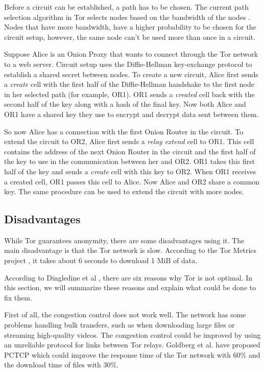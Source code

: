 \documentclass{article}
\begin{document}
		Before a circuit can be established, a path has to be chosen. The current path selection algorithm in Tor selects nodes based on the bandwidth of the nodes \cite{wang2012congestion}. Nodes that have more bandwidth, have a higher probability to be chosen for the circuit setup, however, the same node can't be used more than once in a circuit.
		
		Suppose Alice is an Onion Proxy that wants to connect through the Tor network to a web server. Circuit setup uses the Diffie-Hellman key-exchange protocol \cite{diffiehellman} to establish a shared secret between nodes. To create a new circuit, Alice first sends a \emph{create} cell with the first half of the Diffie-Hellman handshake to the first node in her selected path (for example, OR1). OR1 sends a \emph{created} cell back with the second half of the key along with a hash of the final key. Now both Alice and OR1 have a shared key they use to encrypt and decrypt data sent between them.
		
		So now Alice has a connection with the first Onion Router in the circuit. To extend the circuit to OR2, Alice first sends a \emph{relay extend} cell to OR1. This cell contains the address of the next Onion Router in the circuit and the first half of the key to use in the communication between her and OR2. OR1 takes this first half of the key and sends a \emph{create} cell with this key to OR2. When OR1 receives a created cell, OR1 passes this cell to Alice. Now Alice and OR2 share a common key. The same procedure can be used to extend the circuit with more nodes.
			
	\subsection{Disadvantages}
		\label{ss:tor_disadvantages}

		While Tor guarantees anonymity, there are some disadvantages using it. The main disadvantage is that the Tor network is slow. According to the Tor Metrics project \cite{tormetricsprojectwebsite}, it takes about 6 seconds to download 1 MiB of data.
		
		According to Dingledine et al \cite{dingledine2009performance}, there are six reasons why Tor is not optimal. In this section, we will summarize these reasons and explain what could be done to fix them.
		
		First of all, the congestion control does not work well. The network has some problems handling bulk transfers, such as when downloading large files or streaming high-quality videos. The congestion control could be improved by using an unreliable protocol for links between Tor relays. Goldberg et al. \cite{alsabah2013pctcp} have proposed PCTCP which could improve the response time of the Tor network with 60\% and the download time of files with 30\%.	
		
\end{document}
